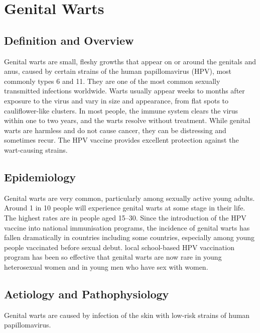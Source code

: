 \chapter{Genital Warts}

\section*{Definition and Overview}
Genital warts are small, fleshy growths that appear on or around the genitals and anus, caused by certain strains of the human papillomavirus (HPV), most commonly types 6 and 11. They are one of the most common sexually transmitted infections worldwide. Warts usually appear weeks to months after exposure to the virus and vary in size and appearance, from flat spots to cauliflower-like clusters. In most people, the immune system clears the virus within one to two years, and the warts resolve without treatment. While genital warts are harmless and do not cause cancer, they can be distressing and sometimes recur. The HPV vaccine provides excellent protection against the wart-causing strains.

\section*{Epidemiology}
Genital warts are very common, particularly among sexually active young adults. Around 1 in 10 people will experience genital warts at some stage in their life. The highest rates are in people aged 15--30. Since the introduction of the HPV vaccine into national immunisation programs, the incidence of genital warts has fallen dramatically in countries including some countries, especially among young people vaccinated before sexual debut. local school-based HPV vaccination program has been so effective that genital warts are now rare in young heterosexual women and in young men who have sex with women.

\section*{Aetiology and Pathophysiology}
Genital warts are caused by infection of the skin with low-risk strains of human papillomavirus.

